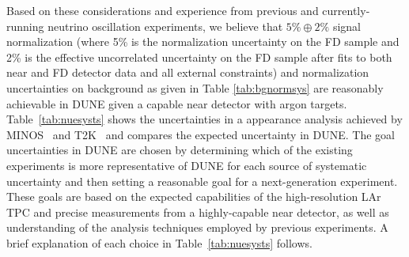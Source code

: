 Based on these considerations and experience from previous and currently-running neutrino oscillation 
experiments, we believe that $5\% \oplus 2\%$ signal normalization (where 5\% is the normalization uncertainty on the
FD \numu sample and 2\% is the effective uncorrelated uncertainty on the FD \nue sample after fits to both near
and FD detector data and all external constraints) and normalization uncertainties on background as given
in Table \ref{tab:bgnormsys} are reasonably achievable in DUNE given a capable near detector with argon targets.
Table~\ref{tab:nuesysts} shows the uncertainties in a \nue appearance analysis achieved by MINOS~\cite{Adamson:2013ue} 
and T2K~\cite{Abe:2015awa} and compares the expected uncertainty in
DUNE. The goal uncertainties in DUNE are chosen by determining which
of the existing experiments is more representative of DUNE for each source
of systematic uncertainty and then setting a reasonable goal for a next-generation
experiment. These goals are based on the expected capabilities of the high-resolution
LAr TPC and  precise measurements from a highly-capable near detector, as well as
understanding of the analysis techniques employed by previous experiments.
A brief explanation of each choice in Table~\ref{tab:nuesysts} follows.
%
